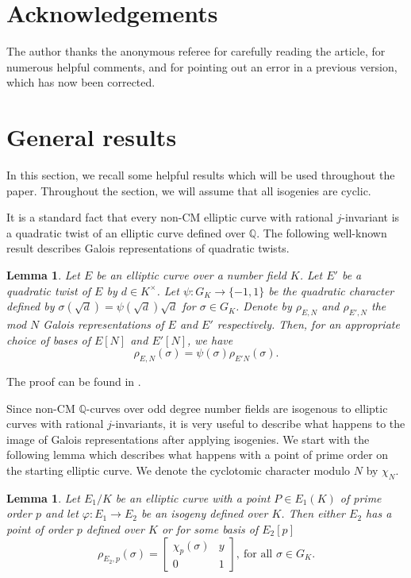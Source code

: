 \documentclass[10pt,leqno]{amsart}
\newcommand\m[1]{\begin{bmatrix}#1\end{bmatrix}}
\newcommand{\Q}{\mathbb{Q}}
\newtheorem{lemma}[theorem]{Lemma}
\theoremstyle{definition}
\theoremstyle{remark}
\numberwithin{theorem}{section}
\begin{document}
\section*{Acknowledgements}

The author thanks the anonymous referee for carefully reading the article, for numerous helpful comments, and for pointing out an error in a previous version, which has now been corrected. 


\section{General results}\label{generalities}
In this section, we recall some helpful results which will be used throughout the paper. Throughout the section, we will assume that all isogenies are cyclic.

It is a standard fact that every non-CM elliptic curve with rational $j$-invariant is a quadratic twist of an elliptic curve defined over $\Q$.  The following well-known result describes Galois representations of quadratic twists.

\begin{lemma}\label{twistanje}
    Let $E$ be an elliptic curve over a number field $K$. Let $E'$ be a quadratic twist of $E$ by $d \in K^\times$. Let $\psi:G_K \to \{-1, 1\}$ be the quadratic character defined by $\sigma(\sqrt{d})=\psi(\sqrt d) \sqrt d$ for $\sigma \in G_K$. Denote by $\rho_{E, N}$ and $\rho_{E', N}$ the mod $N$ Galois representations of $E$ and $E'$ respectively. Then, for an appropriate choice of bases of $E[N]$ and $E'[N]$, we have $$\rho_{E, N}(\sigma)=\psi(\sigma)\rho_{E'N}(\sigma).$$
\end{lemma}
The proof can be found in \cite[Lemma 5.1]{siksek2019}.

Since non-CM $\Q$-curves over odd degree number fields are isogenous to elliptic curves with rational $j$-invariants, it is very useful to describe what happens to the image of Galois representations after applying isogenies. We start with the following lemma which describes what happens with a point of prime order on the starting elliptic curve. We denote the cyclotomic character modulo $N$ by $\chi_N$. 

\begin{lemma}\cite[Lemma 4.2.]{bourdon-najman}\label{tocka-prostog-reda}
    Let $E_1/K$ be an elliptic curve with a point $P \in E_1(K)$ of prime order $p$ and let $\varphi: E_1 \to E_2$ be an isogeny defined over $K$. Then either $E_2$ has a point of order $p$ defined over $K$ or for some basis of $E_2[p]$ $$\rho_{E_2, p}(\sigma)=\m{\chi_p(\sigma) & y \\
    0 & 1}, \ \text{for all } \sigma \in G_K.$$ 
\end{lemma}
\end{document}
